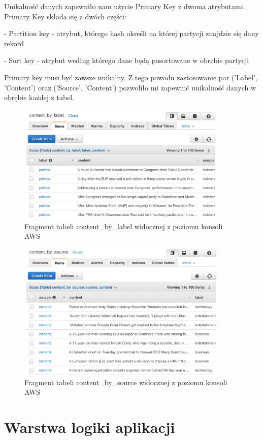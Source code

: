 Unikalność danych zapewniło nam użycie Primary Key z dwoma atrybutami. Primary Key składa się z dwóch części:

- Partition key - atrybut, którego hash określi na której partycji znajdzie się dany rekord

- Sort key - atrybut według którego dane będą posortowane w obrebie partycji

Primary key musi być zawsze unikalny. Z tego powodu zastosowanie par ('Label', 'Content') oraz ('Source', 'Content') pozwoliło mi zapewnić unikalność danych w obrębie każdej z tabel.

\begin{figure}[H]
    \centering
    \includegraphics[width=10cm]{dynamo_by_label.png}
    \caption{Fragment tabeli content\_by\_label widocznej z poziomu konsoli AWS}
\end{figure}

\begin{figure}[H]
    \centering
    \includegraphics[width=10cm]{dynamo_by_source.png}
    \caption{Fragment tabeli content\_by\_source widocznej z poziomu konsoli AWS}
\end{figure}

\newpage
\section{Warstwa logiki aplikacji}

